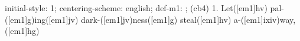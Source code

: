 initial-style: 1;
centering-scheme: english;
def-m1: \grealign;
(cb4) 1. Let([em1]hv) pal-([em1]g)ing([em1]jv) dark-([em1]jv)ness([em1]g) steal([em1]hv) a-([em1]ixiv)way,([em1]hg)